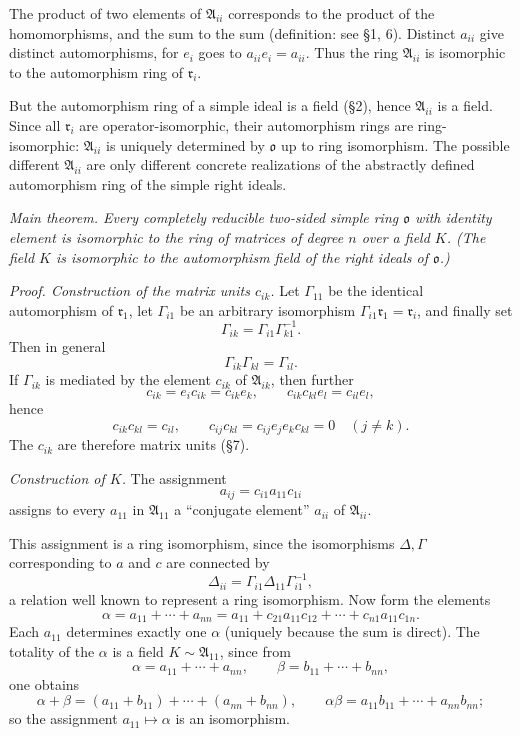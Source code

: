 \documentclass[11pt]{article}
\providecommand{\mA}{\mathfrak{A}}
\providecommand{\mo}{\mathfrak{o}}
\providecommand{\mr}{\mathfrak{r}}
\begin{document}
The product of two elements of $\mA_{ii}$ corresponds to the product of the homomorphisms, and the sum to the sum (definition: see §1, 6). Distinct $a_{ii}$ give distinct automorphisms, for $e_i$ goes to $a_{ii}e_i=a_{ii}$. Thus the ring $\mA_{ii}$ is isomorphic to the automorphism ring of $\mr_i$.

But the automorphism ring of a simple ideal is a field (§2), hence $\mA_{ii}$ is a field. Since all $\mr_i$ are operator-isomorphic, their automorphism rings are ring-isomorphic: $\mA_{ii}$ is uniquely determined by $\mo$ up to ring isomorphism. The possible different $\mA_{ii}$ are only different concrete realizations of the abstractly defined automorphism ring of the simple right ideals.

\emph{Main theorem. Every completely reducible two-sided simple ring $\mo$ with identity element is isomorphic to the ring of matrices of degree $n$ over a field $K$. (The field $K$ is isomorphic to the automorphism field of the right ideals of $\mo$.)}

\emph{Proof. Construction of the matrix units $c_{ik}$.} Let $\Gamma_{11}$ be the identical automorphism of $\mr_1$, let $\Gamma_{i1}$ be an arbitrary isomorphism $\Gamma_{i1}\mr_1=\mr_i$, and finally set
\[
        \Gamma_{ik}=\Gamma_{i1}\Gamma_{k1}^{-1}.
\]
Then in general
\[
        \Gamma_{ik}\Gamma_{kl}=\Gamma_{il}.
\]
If $\Gamma_{ik}$ is mediated by the element $c_{ik}$ of $\mA_{ik}$, then further
\[
        c_{ik}=e_i c_{ik}=c_{ik}e_k,
        \qquad
        c_{ik}c_{kl}e_l=c_{il}e_l,
\]
hence
\[
        c_{ik}c_{kl}=c_{il},
        \qquad
        c_{ij}c_{kl}=c_{ij}e_j e_k c_{kl}=0\quad(j\ne k).
\]
The $c_{ik}$ are therefore matrix units (§7).


\emph{Construction of $K$.} The assignment
\[
        a_{ij}=c_{i1}a_{11}c_{1i}
\]
assigns to every $a_{11}$ in $\mA_{11}$ a ``conjugate element'' $a_{ii}$ of $\mA_{ii}$.

This assignment is a ring isomorphism, since the isomorphisms $\Delta,\Gamma$ corresponding to $a$ and $c$ are connected by
\[
        \Delta_{ii}=\Gamma_{i1}\Delta_{11}\Gamma_{i1}^{-1},
\]
a relation well known to represent a ring isomorphism. Now form the elements
\[
        \alpha=a_{11}+\cdots+a_{nn}=a_{11}+c_{21}a_{11}c_{12}+\cdots+c_{n1}a_{11}c_{1n}.
\]
Each $a_{11}$ determines exactly one $\alpha$ (uniquely because the sum is direct). The totality of the $\alpha$ is a field $K\sim\mA_{11}$, since from
\[
        \alpha=a_{11}+\cdots+a_{nn},
        \qquad
        \beta=b_{11}+\cdots+b_{nn},
\]
one obtains
\[
        \alpha+\beta=(a_{11}+b_{11})+\cdots+(a_{nn}+b_{nn}),
        \qquad
        \alpha\beta=a_{11}b_{11}+\cdots+a_{nn}b_{nn};
\]
so the assignment $a_{11}\mapsto\alpha$ is an isomorphism.
\end{document}
